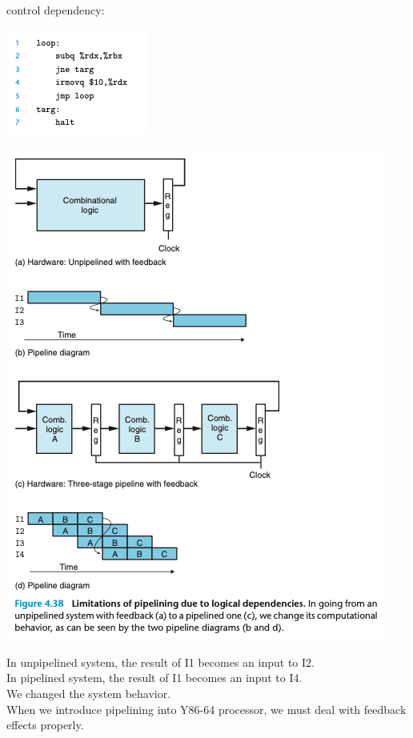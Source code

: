 \documentclass[11pt]{article}
\begin{document}
\begin{enumerate}
control dependency:\\

\begin{center}
\includegraphics[width=.9\linewidth]{pics/control-dependency.png}
\end{center}

\begin{center}
\includegraphics[width=.9\linewidth]{pics/figure4.38-limitations-of-pipelining-due-to-logical-dependencies.png}
\end{center}

In unpipelined system, the result of I1 becomes an input to I2.\\
In pipelined system, the result of I1 becomes an input to I4.\\
We changed the system behavior.\\
When we introduce pipelining into Y86-64 processor, we must deal with feedback effects properly.\\
\end{enumerate}
\end{document}
